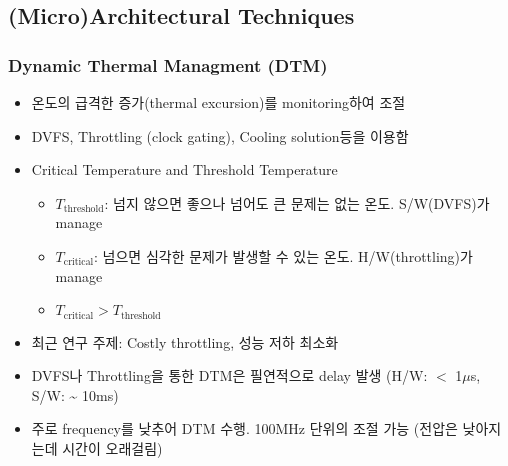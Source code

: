 \subsection{(Micro)Architectural Techniques}

\subsubsection*{Dynamic Thermal Managment (DTM)}
\begin{itemize}
    \item 온도의 급격한 증가(thermal excursion)를 monitoring하여 조절
    \item DVFS, Throttling (clock gating), Cooling solution등을 이용함
    \item Critical Temperature and Threshold Temperature
    \begin{itemize}
        \item $T_{\mathrm{threshold}}$: 넘지 않으면 좋으나 넘어도 큰 문제는 없는 온도. S/W(DVFS)가 manage
        \item $T_{\mathrm{critical}}$: 넘으면 심각한 문제가 발생할 수 있는 온도. H/W(throttling)가 manage
        \item $T_{\mathrm{critical}} > T_{\mathrm{threshold}}$
    \end{itemize}
    \item 최근 연구 주제: Costly throttling, 성능 저하 최소화
    \item DVFS나 Throttling을 통한 DTM은 필연적으로 delay 발생 (H/W: $<$ 1$\mu$s, S/W: \textasciitilde{} 10ms)
    \begin{figures}
    \end{figures}
    \item 주로 frequency를 낮추어 DTM 수행. 100MHz 단위의 조절 가능 (전압은 낮아지는데 시간이 오래걸림)
\end{itemize}

